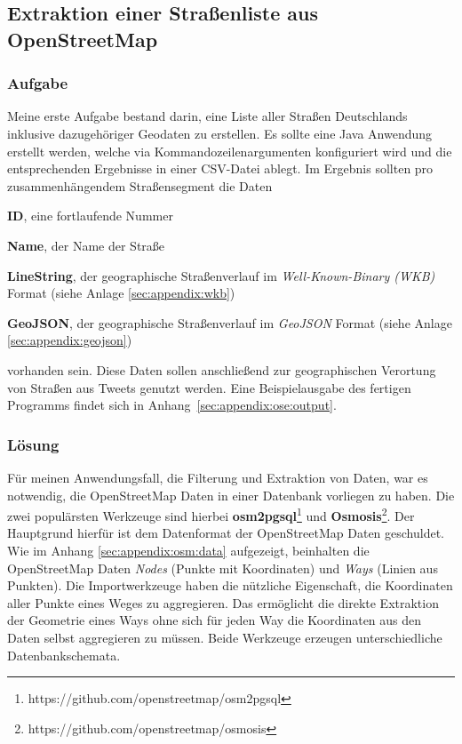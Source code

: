 \subsection{Extraktion einer Straßenliste aus OpenStreetMap}

\subsubsection{Aufgabe}
Meine erste Aufgabe bestand darin, eine Liste aller Straßen Deutschlands inklusive dazugehöriger Geodaten zu erstellen.
Es sollte eine Java Anwendung erstellt werden, welche via Kommandozeilenargumenten konfiguriert wird und die entsprechenden Ergebnisse in einer CSV-Datei ablegt.
Im Ergebnis sollten pro zusammenhängendem Straßensegment die Daten
\begin{compactitem}
  \item \textbf{ID}, eine fortlaufende Nummer
  \item \textbf{Name}, der Name der Straße
  \item \textbf{LineString}, der geographische Straßenverlauf im \textit{Well-Known-Binary (WKB)} Format (siehe Anlage \ref{sec:appendix:wkb})
  \item \textbf{GeoJSON}, der geographische Straßenverlauf im \textit{GeoJSON} Format (siehe Anlage \ref{sec:appendix:geojson})
\end{compactitem}
vorhanden sein.
Diese Daten sollen anschließend zur geographischen Verortung von Straßen aus Tweets genutzt werden.
Eine Beispielausgabe des fertigen Programms findet sich in Anhang~\ref{sec:appendix:ose:output}.

\subsubsection{Lösung}

Für meinen Anwendungsfall, die Filterung und Extraktion von Daten, war es notwendig, die OpenStreetMap Daten in einer Datenbank vorliegen zu haben.
Die zwei populärsten Werkzeuge sind hierbei \textbf{osm2pgsql}\footnote{https://github.com/openstreetmap/osm2pgsql}\label{osm2pgsql} und \textbf{Osmosis}\footnote{https://github.com/openstreetmap/osmosis}.
Der Hauptgrund hierfür ist dem Datenformat der OpenStreetMap Daten geschuldet. Wie im Anhang \ref{sec:appendix:osm:data} aufgezeigt, beinhalten die OpenStreetMap Daten \textit{Nodes} (Punkte mit Koordinaten) und \textit{Ways} (Linien aus Punkten). Die Importwerkzeuge haben die nützliche Eigenschaft, die Koordinaten aller Punkte eines Weges zu aggregieren.
Das ermöglicht die direkte Extraktion der Geometrie eines Ways ohne sich für jeden Way die Koordinaten aus den Daten selbst aggregieren zu müssen.
Beide Werkzeuge erzeugen unterschiedliche Datenbankschemata.

